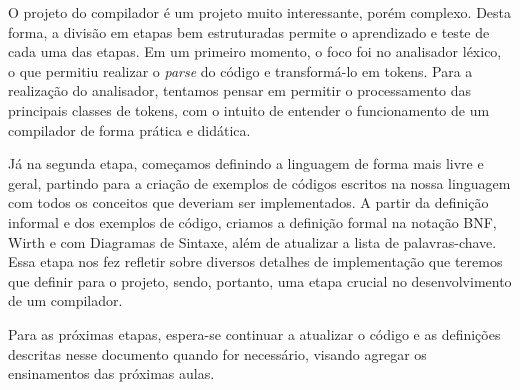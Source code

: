 
O projeto do compilador é um projeto muito interessante, porém complexo. Desta forma, a divisão em etapas bem estruturadas permite o aprendizado e teste de cada uma das etapas. Em um primeiro momento, o foco foi no analisador léxico, o que permitiu realizar o \emph{parse} do código e transformá-lo em tokens. Para a realização do analisador, tentamos pensar em permitir o processamento das principais classes de tokens, com o intuito de entender o funcionamento de um compilador de forma prática e didática.

Já na segunda etapa, começamos definindo a linguagem de forma mais livre e geral, partindo para a criação de exemplos de códigos escritos na nossa linguagem com todos os conceitos que deveriam ser implementados. A partir da definição informal e dos exemplos de código, criamos a definição formal na notação BNF, Wirth e com Diagramas de Sintaxe, além de atualizar a lista de palavras-chave. Essa etapa nos fez refletir sobre diversos detalhes de implementação que teremos que definir para o projeto, sendo, portanto, uma etapa crucial no desenvolvimento de um compilador.

Para as próximas etapas, espera-se continuar a atualizar o código e as definições descritas nesse documento quando for necessário, visando agregar os ensinamentos das próximas aulas.
